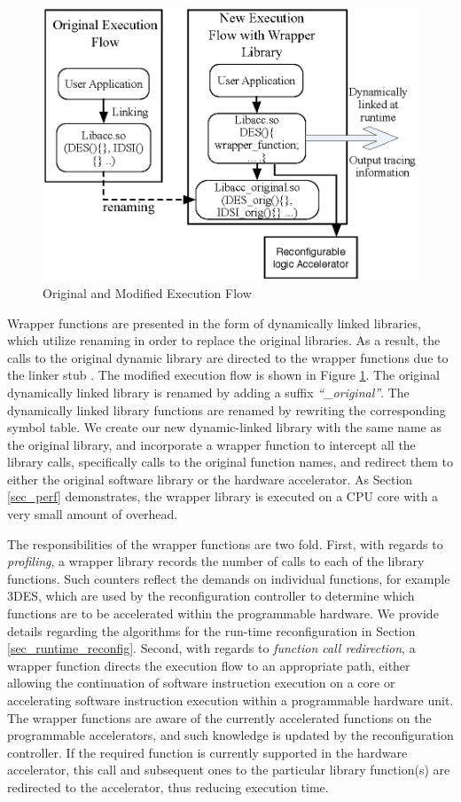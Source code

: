 \begin{figure}
    \centering
    \includegraphics[width=4.0 in]{HPCA14-wrapperlib}
    \caption{Original and Modified Execution Flow}
    \label{fig_transacc_flow}
\end{figure}

Wrapper functions are presented in the form of dynamically linked
libraries, which utilize renaming in order to replace the original libraries. As a result,
the calls to the original dynamic library are directed to the wrapper
functions due to the linker stub \cite{linkerstub}. The modified
execution flow is shown in Figure \ref{fig_transacc_flow}.  The
original dynamically linked library is renamed by adding a suffix
{\em ``\_original''}.  The dynamically linked library functions are renamed by rewriting the corresponding symbol table. 
We create our new dynamic-linked library with the same name as the original library, and
incorporate a wrapper function to intercept all the library calls, specifically calls to the original function names, and
redirect them to either the original software library or the hardware
accelerator. As 
Section \ref{sec_perf} demonstrates, the wrapper library is
executed on a CPU core with a very small amount of overhead.

The responsibilities of the wrapper functions are two fold.
First, with regards to {\em profiling},
a wrapper library records the number of calls to each of the
library functions. Such counters reflect the demands on individual
functions, for example 3DES, which are used by the reconfiguration
controller to determine which functions are to be accelerated within the
programmable hardware. We provide details regarding the algorithms for the
run-time reconfiguration in Section \ref{sec_runtime_reconfig}.
Second, with regards to {\em function call redirection},
 a wrapper function directs the
execution flow to an appropriate path, either allowing the continuation of software instruction execution on a core or
accelerating software instruction execution within a programmable hardware unit. The wrapper functions
are aware of the currently accelerated functions on the programmable
accelerators, and such knowledge is updated by the reconfiguration
controller. If the required function is currently supported in the hardware
accelerator, this call and subsequent ones to the particular library
function(s) are redirected to the accelerator, thus reducing execution
time.

